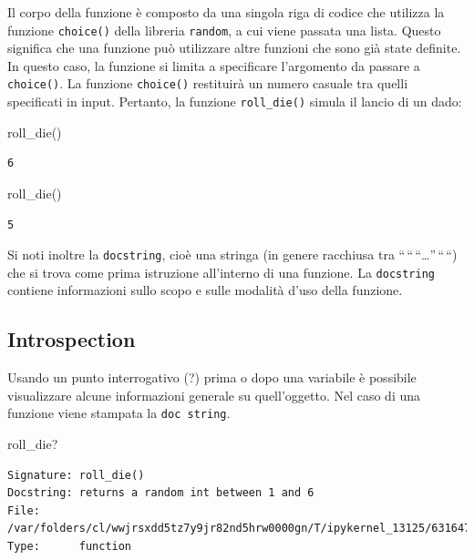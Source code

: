 \documentclass[
  letterpaper,
  krantz2]{{[}./krantz{]}}
\newenvironment{Shaded}{\begin{snugshade}}{\end{snugshade}}
\newcommand{\NormalTok}[1]{\textcolor[rgb]{0.00,0.23,0.31}{#1}}
\begin{document}
Il corpo della funzione è composto da una singola riga di codice che
utilizza la funzione \texttt{choice()} della libreria \texttt{random}, a
cui viene passata una lista. Questo significa che una funzione può
utilizzare altre funzioni che sono già state definite. In questo caso,
la funzione si limita a specificare l'argomento da passare a
\texttt{choice()}. La funzione \texttt{choice()} restituirà un numero
casuale tra quelli specificati in input. Pertanto, la funzione
\texttt{roll\_die()} simula il lancio di un dado:

\begin{Shaded}
\begin{Highlighting}[]
\NormalTok{roll\_die()}
\end{Highlighting}
\end{Shaded}

\begin{verbatim}
6
\end{verbatim}

\begin{Shaded}
\begin{Highlighting}[]
\NormalTok{roll\_die()}
\end{Highlighting}
\end{Shaded}

\begin{verbatim}
5
\end{verbatim}

Si noti inoltre la \texttt{docstring}, cioè una stringa (in genere
racchiusa tra ``\,``\,``\ldots{}''\,``\,``) che si trova come prima
istruzione all'interno di una funzione. La \texttt{docstring} contiene
informazioni sullo scopo e sulle modalità d'uso della funzione.

\subsection{Introspection}\label{introspection}

Usando un punto interrogativo (?) prima o dopo una variabile è possibile
visualizzare alcune informazioni generale su quell'oggetto. Nel caso di
una funzione viene stampata la \texttt{doc\ string}.

\begin{Shaded}
\begin{Highlighting}[]
\NormalTok{roll\_die?}
\end{Highlighting}
\end{Shaded}

\begin{verbatim}
Signature: roll_die()
Docstring: returns a random int between 1 and 6
File:      /var/folders/cl/wwjrsxdd5tz7y9jr82nd5hrw0000gn/T/ipykernel_13125/63164766.py
Type:      function
\end{verbatim}
\end{document}
